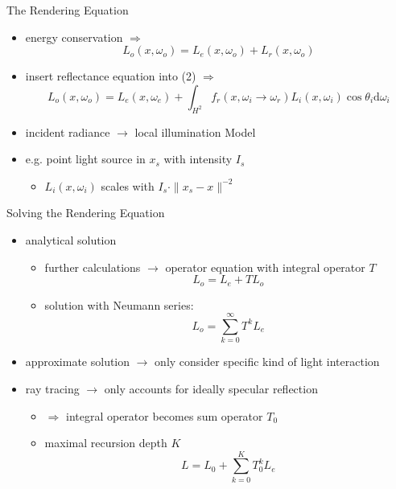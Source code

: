 \begin{frame}{The Rendering Equation}
\begin{itemize}
\pause
\item energy conservation $\Rightarrow$
\begin{equation}
L_o(x, \omega_o) =  L_e(x, \omega_o) +  L_r(x, \omega_o)
\end{equation}
\pause
\item insert reflectance equation into (2) $\Rightarrow$
\begin{equation} L_o(x, \omega_o) =  L_e(x, \omega_e) + \int_{H^2} f_r(x, \omega_i \rightarrow \omega_r) L_i(x, \omega_i) \cos \theta_i \mathrm{d}\omega_i 
\end{equation}
\pause
\item incident radiance $\rightarrow$ local illumination Model 
\item e.g. point light source in $x_s$ with intensity $I_s$ 
\begin{itemize}
    \item $L_i(x, \omega_i)$  scales with $I_s \cdot \|x_s -x\|^{-2}$
\end{itemize}
\end{itemize}
\end{frame}

\begin{frame}{Solving the Rendering Equation}
\begin{itemize}
\item analytical solution 
\begin{itemize}
\pause
\item  further calculations $\rightarrow$ operator equation with integral operator $T$
\begin{equation}
    L_o = L_e + TL_o
\end{equation}
\pause
\item solution with Neumann series: 
\begin{equation}
    L_o = \sum_{k= 0}^{\infty} T^k L_e
\end{equation}
\end{itemize}
\pause
\item approximate solution $\rightarrow$ only consider specific kind of light interaction
\pause
\item ray tracing $\rightarrow$ only accounts for ideally specular reflection
\begin{itemize}
    \pause
    \item  $\Rightarrow$ integral operator becomes sum operator 
    $T_0$
    \pause
    \item maximal recursion depth $K$
\begin{equation}
     L = L_0 + \sum_{k= 0}^{K} T_0^k L_e
\end{equation}
\end{itemize}
\end{itemize}
\end{frame}

